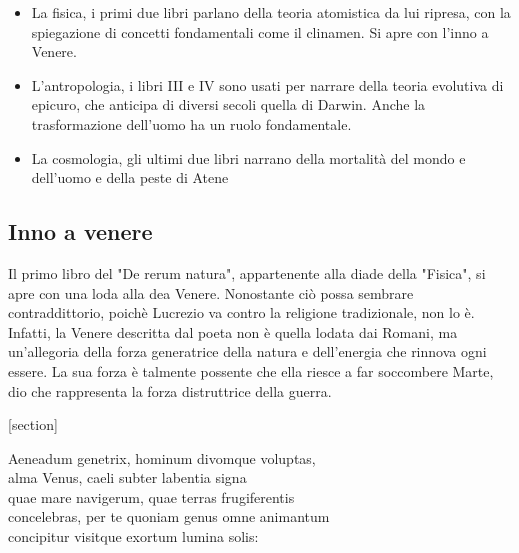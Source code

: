 \documentclass[10pt,a4paper]{article}
\begin{document}
	\begin{itemize}
		\item La fisica, i primi due libri parlano della teoria atomistica da lui ripresa, con la spiegazione di concetti fondamentali come il clinamen. Si apre con l'inno a Venere.
		\item L'antropologia, i libri III e IV sono usati per narrare della teoria evolutiva di epicuro, che anticipa di diversi secoli quella di Darwin. Anche la trasformazione dell'uomo ha un ruolo fondamentale. 
		\item La cosmologia, gli ultimi due libri narrano della mortalità del mondo e dell'uomo e della peste di Atene
	\end{itemize}

	\subsection{Inno a venere}
	
	Il primo libro del "De rerum natura", appartenente alla diade della "Fisica", si apre con una loda alla dea Venere. Nonostante ciò possa sembrare contraddittorio, poichè Lucrezio va contro la religione tradizionale, non lo è. Infatti, la Venere descritta dal poeta non è quella lodata dai Romani, ma un'allegoria della forza generatrice della natura e dell'energia che rinnova ogni essere. La sua forza è talmente possente che ella riesce a far soccombere Marte, dio che rappresenta la forza distruttrice della guerra. 
	
	
	
	
	
	
	
	[section]
		\begin{estratto}
			Aeneadum genetrix, hominum divomque voluptas, \\
			alma Venus, caeli subter labentia signa \\
			quae mare navigerum, quae terras frugiferentis \\
			concelebras, per te quoniam genus omne animantum \\
			concipitur visitque exortum lumina solis:
		\end{estratto}
	
\end{document}
